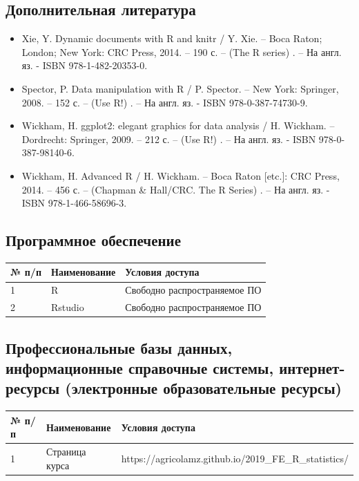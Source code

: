 \documentclass[a4paper]{article}
\begin{document}
\subsection{Дополнительная литература}
\begin{itemize}
\item   Xie, Y. Dynamic documents with R and knitr / Y. Xie. – Boca Raton; London; New York: CRC Press, 2014. – 190 с. – (The R series) . – На англ. яз. - ISBN 978-1-482-20353-0. 
\item Spector, P.  Data manipulation with R / P. Spector. – New York: Springer, 2008. – 152 с. – (Use R!) . – На англ. яз. - ISBN 978-0-387-74730-9. 
\item   Wickham, H. ggplot2: elegant graphics for data analysis / H. Wickham. – Dordrecht: Springer, 2009. – 212 с. – (Use R!) . – На англ. яз. - ISBN 978-0-387-98140-6. 
\item   Wickham, H. Advanced R / H. Wickham. – Boca Raton [etc.]: CRC Press, 2014. – 456 с. – (Chapman \& Hall/CRC. The R Series) . – На англ. яз. - ISBN 978-1-466-58696-3. 
\end{itemize}
\subsection{Программное обеспечение}
\begin{tabular}{|l|l|l|}
\hline
№ п/п &	Наименование	& Условия доступа \\ \hline
1	& R &	Свободно распространяемое ПО \\ \hline
2	& Rstudio &	Свободно распространяемое ПО \\ \hline
\end{tabular}
\subsection{Профессиональные базы данных, информационные справочные системы, интернет-ресурсы (электронные образовательные ресурсы)}

\begin{tabular}{|l|l|l|}
\hline
№ п/п &	Наименование	& Условия доступа \\ \hline
1	& Страница курса &	https://agricolamz.github.io/2019\_FE\_R\_statistics/ \\ \hline
\end{tabular}
\end{document}
